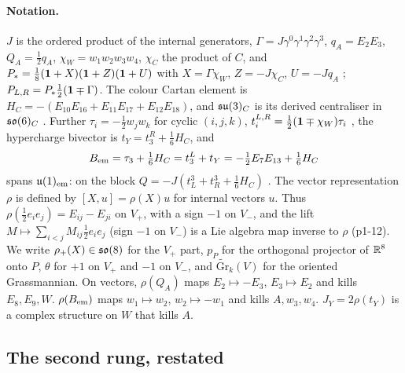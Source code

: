 \paragraph{Notation.} $J$ is the ordered product of the internal generators, $\Gamma=J\gamma^0\gamma^1\gamma^2\gamma^3$, $q_A=E_2E_3$, $Q_A=\tfrac12q_A$, $\chi_W=w_1w_2w_3w_4$,
$\chi_C$ the product of $C$, and $P_*=\tfrac18(\mathbf 1+X)(\mathbf 1+Z)(\mathbf 1+U)$ with $X=\Gamma\chi_W$, $Z=-J\chi_C$, $U=-Jq_A$ \cite[Thm.~8.1]{ES17}; $P_{L,R}=P_*\tfrac12(\mathbf 1\mp\Gamma)$.
The colour Cartan element is $H_C=-(E_{10}E_{16}+E_{11}E_{17}+E_{12}E_{18})$, and $\mathfrak{su}(3)_C$ is its derived centraliser in $\mathfrak{so}(6)_C$ \cite[Prop.~8.4]{ES17}. Further
$\tau_i=-\tfrac12w_jw_k$ for cyclic $(i,j,k)$, $t^{L,R}_i=\tfrac12(\mathbf 1\mp\chi_W)\tau_i$ \cite[Thm.~8.2]{ES17}, the hypercharge bivector is $t_Y=t^R_3+\tfrac16H_C$, and
\[
B_{\rm em}=\tau_3+\tfrac16H_C=t^L_3+t_Y=-\tfrac12E_7E_{13}+\tfrac16H_C
\]
spans $\mathfrak{u}(1)_{\rm em}$: on the block $Q=-J(t^3_L+t^3_R+\tfrac16H_C)$ \cite[Prop.~8.4]{ES17}. The vector representation $\rho$ is defined by $[X,u]=\rho(X)u$ for internal
vectors $u$. Thus $\rho(\tfrac12e_ie_j)=E_{ij}-E_{ji}$ on $V_+$, with a sign $-1$ on $V_-$, and the lift $M\mapsto\sum_{i<j}M_{ij}\tfrac12e_ie_j$ (sign $-1$ on $V_-$) is a Lie
algebra map inverse to $\rho$ (p1-12). We write $\rho_+(X)\in\mathfrak{so}(8)$ for the $V_+$ part, $p_P$ for the orthogonal projector of $\mathbb{R}^8$ onto $P$, $\theta$ for $+1$ on $V_+$ and
$-1$ on $V_-$, and $\widetilde{\mathrm{Gr}}_k(V)$ for the oriented Grassmannian. On vectors, $\rho(Q_A)$ maps $E_2\mapsto-E_3$, $E_3\mapsto E_2$ and kills $E_8,E_9,W$. $\rho(B_{\rm em})$
maps $w_1\mapsto w_2$, $w_2\mapsto-w_1$ and kills $A,w_3,w_4$. $J_Y=2\rho(t_Y)$ is a complex structure on $W$ that kills $A$.

\subsection{The second rung, restated}
\label{p1:sec:n2}


